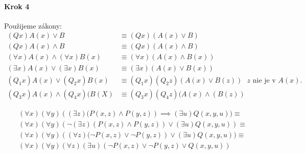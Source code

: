 \paragraph{Krok 4}
Použijeme zákony:
\begin{align*}
    (Q x) A(x) \lor B &\equiv (Q x)(A(x) \lor B) \\
    (Q x)A(x) \land B &\equiv (Q x)(A(x) \land B) \\
    (\forall x) A(x) \land (\forall x)B(x) &\equiv 
        (\forall x)(A(x) \land B(x)) \\
    (\exists x)A(x) \lor (\exists x)B(x) &\equiv 
        (\exists x) (A(x)\lor B(x)) \\
    (Q_1 x) A(x) \lor (Q_2 x)B(x) &\equiv
        (Q_1 x)(Q_2 z) (A(x)\lor B(z)) \mbox{ $z$ nie je v $A(x)$}. \\
    (Q_3 x) A(x) \land (Q_4 x)(B(X) &\equiv 
        (Q_3 x)(Q_4 z)(A(x) \land (B(z))
\end{align*}

\begin{priklad}
    \begin{align*}
        (\forall x)(\forall y) \left( (\exists z)(P(x,z) \land
            P(y,z)\right) \implies (\exists u) Q(x,y,u)) \equiv \\
        (\forall x)(\forall y)\left(\neg (\exists z)(P(x,z)\land 
            P(y,z))\lor(\exists u)Q(x,y,u)\right) \equiv \\
        (\forall x)(\forall y)\left((\forall z)(\neg P(x,z)\lor 
            \neg P(y,z)\right)\lor(\exists u)Q(x,y,u)) \equiv \\
        (\forall x)(\forall y)(\forall z)(\exists u)(\neg P(x,z) \lor 
            \neg P(y,z) \lor Q(x,y,u))
    \end{align*}
\end{priklad}
